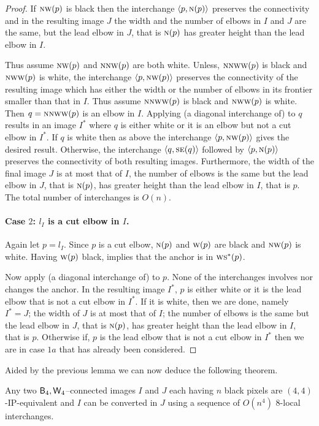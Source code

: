 \documentclass[lotsofwhite,charterfonts]{patmorin}
\newcommand{\fourfour}{\ensuremath{\protect\textup{\textsf{B}}_{4},\protect\textup{\textsf{W}}_{4}}}
\newcommand{\N}{\textsc{n}}
\newcommand{\SE}{\textsc{se}}
\renewcommand{\S}{\textsc{s}}
\newcommand{\W}{\textsc{w}}
\newcommand{\NW}{\textsc{nw}}
\newcommand{\ic}[2]{\langle #1,#2 \rangle}
\begin{document}
\begin{proof}
If $\NW(p)$ is black then the interchange $\ic{p}{\N(p)}$ preserves the connectivity and in the resulting image $J$ the width and the number of elbows in $I$ and $J$ are the same, but the lead elbow in $J$, that is $\N(p)$ has greater height than the  lead elbow in $I$. 

Thus assume $\NW(p)$ and $\N\NW(p)$ are both white. Unless, $\N\NW\W(p)$ is black and $\NW\W(p)$ is white, the interchange $\ic{p}{\NW(p)}$ preserves the connectivity of the resulting image which has either the width or the number of elbows in its frontier smaller than that in $I$. Thus assume $\N\NW\W(p)$ is black and $\NW\W(p)$ is white. Then $q=\N\NW\W(p)$ is an elbow in $I$. Applying (a diagonal interchange of)  to $q$ results in an image $I^*$ where $q$ is either white or it is an elbow but not a cut elbow in $I^*$. If $q$ is white then as above the interchange $\ic{p}{\NW(p)}$ gives the desired result. Otherwise, the interchange $\ic{q}{\SE(q)}$ followed by $\ic{p}{\N(p)}$ preserves the connectivity of both resulting images. Furthermore, the width of the final image $J$ is at most that of $I$, the number of elbows is the same but the lead elbow in $J$, that is $\N(p)$, has greater height than the lead elbow in $I$, that is $p$. The total number of interchanges is $O(n)$.

\paragraph{Case $2$: $l_I$ is a cut elbow in $I$.} Again let $p=l_I$. Since $p$ is a cut elbow, $\N(p)$ and $\W(p)$ are black and $\NW(p)$ is white. Having $\W(p)$ black, implies that the anchor is in $\W\S^*(p)$. 

Now apply (a diagonal interchange of)  to $p$. None of the interchanges involves nor changes the anchor. In the resulting image $I^*$, $p$ is either white or it is the lead elbow that is not a cut elbow in $I^*$. If it is white, then we are done, namely $I^*=J$; the width of $J$ is at most that of $I$; the number of elbows is the same but the lead elbow in $J$, that is $\N(p)$, has greater height than the lead elbow in $I$, that is $p$. Otherwise if, $p$ is the lead elbow that is not a cut elbow in $I^*$ then we are in case $1a$ that has already been considered.  
\end{proof}

Aided by the previous lemma we can now deduce the following theorem.

\begin{thm}
Any two \fourfour--connected images $I$ and $J$ each having $n$ black
pixels are $(4,4)$-IP-equivalent and $I$ can be converted in $J$ using a
sequence of $O(n^4)$ 8-local interchanges.
\end{thm}
\end{document}
